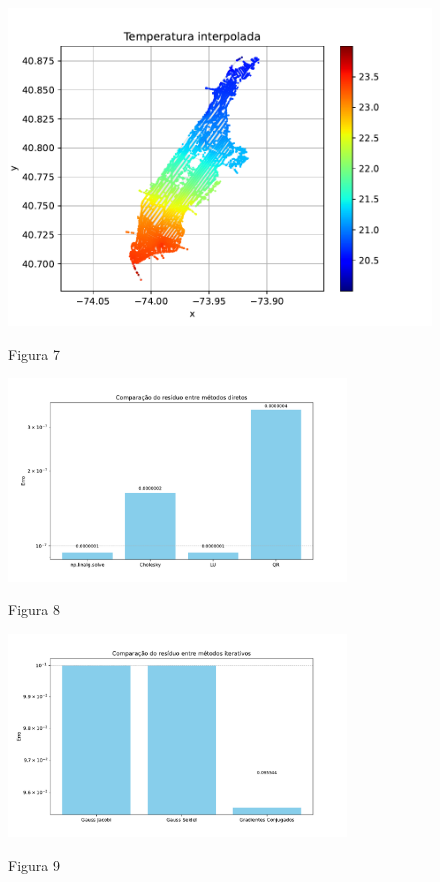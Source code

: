 \documentclass{article}
\begin{document}
    \begin{figure}[ht]
        \centering
        \includegraphics[width=1\textwidth, trim={5px 10px 55px 25px},clip]{../figs/fig7.pdf}
        
        \LARGE{Figura 7}
    \end{figure}

    \newpage

    \begin{figure}[ht]
        \centering
        \includegraphics[width=0.8\textwidth, trim={5px 10px 15px 25px},clip]{../figs/fig8.pdf}
        
        Figura 8
    \end{figure}

    \vspace{2cm}

    \begin{figure}[ht]
        \centering
        \includegraphics[width=0.8\textwidth, trim={5px 10px 15px 25px},clip]{../figs/fig9.pdf}
        
        Figura 9
    \end{figure}
\end{document}
